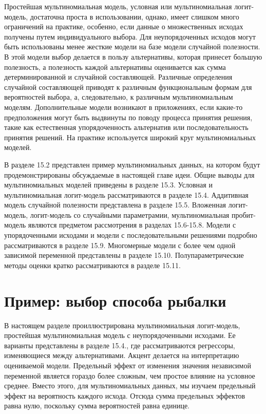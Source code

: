 Простейшая мультиномиальная модель, условная или мультиномиальная логит-модель, достаточна проста в использовании, однако, имеет слишком много ограничений на практике, особенно, если данные о множественных исходах получены путем индивидуального выбора. Для неупорядоченных исходов могут быть использованы менее жесткие модели на базе модели случайной полезности. 
В этой модели выбор делается в пользу альтернативы, которая принесет большую полезность, а полезность каждой альтернативы оценивается как сумма детерминированной и случайной составляющей. Различные определения случайной составляющей приводят к  различным функциональным формам для вероятностей выбора, а, следовательно, к различным мультиномиальным моделям. Дополнительные модели возникают в приложениях, если какие-то предположения могут быть выдвинуты по поводу процесса принятия решения, такие как естественная упорядоченность альтернатив или последовательность принятия решений. На практике используется широкий круг мультиномиальных моделей.

В разделе 15.2 представлен пример мультиномиальных данных, на котором будут продемонстрированы обсуждаемые в настоящей главе идеи. Общие выводы для мультиномиальных моделей приведены в разделе 15.3. Условная и мультиномиальная логит-модель рассматриваются в разделе 15.4. Аддитивная модель случайной полезности представлена в разделе 15.5. Вложенная логит-модель, логит-модель со случайными параметрамии, мультиномиальная пробит-модель являются предметом рассмотрения в разделах 15.6-15.8. Модели с упорядоченными исходами и модели с последовательными решениями подробно рассматриваются в разделе 15.9. Многомерные модели с более чем одной зависимой переменной представлены в разделе 15.10. Полупараметрические методы оценки кратко рассматриваются в разделе 15.11.

\section{Пример: выбор способа рыбалки}

В настоящем разделе проиллюстрирована мультиномиальная логит-модель, простейшая мультиномиальная модель с неупорядоченными исходами. Ее варианты представлены в разделе 15.4., где рассматриваются регрессоры, изменяющиеся между альтернативами. Акцент делается на интерпретацию оцениваемой модели. Предельный эффект от изменения значения независимой переменной является гораздо более сложным, чем простое влияние на условное среднее. Вместо этого, для мультиномиальных данных, мы изучаем предельный эффект на вероятность каждого исхода. Отсюда сумма предельных эффектов равна нулю, поскольку сумма вероятностей равна единице.

